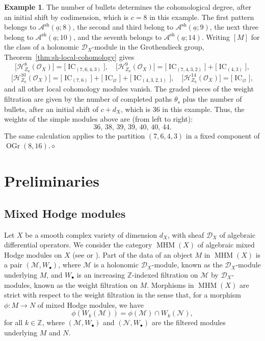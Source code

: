 \documentclass[12pt]{amsart}
\renewcommand{\a}{\underline{a}}
\theoremstyle{definition}
\newtheorem{example}[theorem]{Example}
\numberwithin{equation}{section}
\begin{document}
\begin{example}
\noindent The number of bullets determines the cohomological degree, after an initial shift by codimension, which is $c=8$ in this example. The first pattern belongs to $\mathscr{A}^{\mathrm{sh}}(\a;8)$, the second and third belong to $\mathscr{A}^{\mathrm{sh}}(\a;9)$, the next three belong to $\mathscr{A}^{\mathrm{sh}}(\a;10)$, and the seventh belongs to $\mathscr{A}^{\mathrm{sh}}(\a;14)$. Writing $[M]$ for the class of a holonomic $\mathscr D_X$-module in the Grothendieck group, Theorem~\ref{thm:sh-local-cohomology} gives
\[
 \big[\mathscr H^8_{Z_{\a}}(\mathscr O_X)\big]
   =\big[\operatorname{IC}_{(7,6,4,3)}\big],\quad
 \big[\mathscr H^9_{Z_{\a}}(\mathscr O_X)\big]
   =\big[\operatorname{IC}_{(7,4,3,2)}\big]
     +\big[\operatorname{IC}_{(4,3)}\big],
     \]
     \[
 \big[\mathscr H^{10}_{Z_{\a}}(\mathscr O_X)\big]
   =\big[\operatorname{IC}_{(7,6)}\big]
     +\big[\operatorname{IC}_{\varnothing}\big]
     +\big[\operatorname{IC}_{(4,3,2,1)}\big],\quad
 \big[\mathscr H^{14}_{Z_{\a}}(\mathscr O_X)\big]
   =\big[\operatorname{IC}_{\varnothing}\big],
\]
and all other local cohomology modules vanish. The graded pieces of the weight filtration are given by the number of completed paths $\theta_s$ plus the number of bullets, after an initial shift of $c+d_X$, which is $36$ in this example. Thus, the weights of the simple modules above are (from left to right):
\[
36,\, 38,\, 39,\, 39,\, 40,\, 40,\, 44.
\]
The same calculation applies to the partition
$(7,6,4,3)$ in a fixed component of $\operatorname{OGr}(8,16)$.\hfill\mbox{$\diamond$}
\end{example}



\section{Preliminaries}\label{sec:preliminaries}

\subsection{Mixed Hodge modules}

Let $X$ be a smooth complex variety of dimension $d_X$, with sheaf $\mathscr{D}_X$ of algebraic differential operators. We consider the category $\operatorname{MHM}(X)$ of algebraic mixed Hodge modules on $X$ (see \cite{saito90} or \cite[Section 8.3.3]{htt}). Part of the data of an object $M$ in $\operatorname{MHM}(X)$ is a pair $(\mathscr{M}, W_{\bullet})$, where $\mathscr{M}$ is a holonomic $\mathscr{D}_X$-module, known as the $\mathscr{D}_X$-module underlying $M$, and $W_{\bullet}$ is an increasing $\mathbb{Z}$-indexed filtration on $\mathscr{M}$ by $\mathscr{D}_X$-modules, known as the weight filtration on $M$. Morphisms in $\operatorname{MHM}(X)$ are strict with respect to the weight filtration in the sense that, for a morphism $\phi:M\to N$ of mixed Hodge modules, we have
\begin{equation}
\phi(W_k(\mathscr{M}))=\phi(\mathscr{M})\cap W_k(\mathscr{N}),    
\end{equation}
for all $k\in \mathbb{Z}$, where $(\mathscr{M},W_{\bullet})$ and $(\mathscr{N},W_{\bullet})$ are the filtered modules underlying $M$ and $N$.
\end{document}
